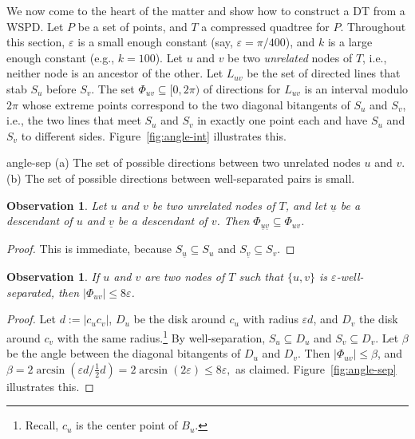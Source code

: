 \documentclass[11pt]{paper}
\newcommand {\eps} {\varepsilon}
\newcommand {\eqdef} {:=}
\newcommand {\child} {\underline}
\newtheorem {observation}[theorem] {Observation}
\begin{document}
We now come to the heart of the matter and show how to construct a DT from
a WSPD. Let $P$ be a set of points, and $T$ a
compressed quadtree for $P$. Throughout this section, $\eps$ is a
small enough constant (say, $\eps = \pi/400$), and $k$ is
a large enough constant (e.g., $k = 100$).
Let $u$ and $v$ be two \emph{unrelated} nodes of $T$, i.e.,
neither node is an ancestor of the other. Let $L_{uv}$ be the 
set of directed lines that stab $S_u$ before $S_v$. 
The set $\Phi_{uv} \subseteq [0, 2 \pi)$ of directions for $L_{uv}$
is an interval modulo ${2\pi}$
whose extreme points correspond to
the two diagonal bitangents of $S_u$ and $S_v$, i.e., the two lines that
meet $S_u$ and $S_v$ in exactly one point each and have $S_u$ and
$S_v$ to different sides. 
Figure~\ref {fig:angle-int} illustrates this.

 {angle-sep} {(a) The set of possible directions 
between two unrelated nodes $u$ and $v$. (b) The set of possible directions 
between well-separated pairs is small.}

\begin {observation} \label {obs:directions-contained}
Let $u$ and $v$ be two unrelated nodes of $T$, and let $\child u$ be a
descendant of $u$ and $\child v$ be a descendant of $v$.
Then $\Phi_{\child u \child v} \subseteq \Phi_{uv}$.
\end {observation}

\begin{proof}
This is immediate, because $S_{\child u} \subseteq S_u$ and
$S_{\child v} \subseteq S_v$.
\end{proof}

\begin{observation}\label{obs:small-Phi}
If $u$ and $v$ are two  nodes of $T$ such that $\{u,v\}$ is
$\eps$-well-separated, then
$|\Phi_{uv}| \leq 8\eps$.
\end{observation}

\begin{proof}
  Let $d \eqdef |c_uc_v|$, $D_u$ be the disk around $c_u$ with radius
  $\eps d$, and $D_v$ the disk around $c_v$ with the same radius.\footnote
  {Recall, $c_u$ is the center point of $B_u$.}
  By well-separation, $S_u \subseteq D_u$ and $S_v \subseteq D_v$. Let $\beta$
  be the angle between the 
  diagonal bitangents of $D_u$ and $D_v$. Then
  $|\Phi_{uv}| \leq \beta$, and 
  $ 
  \beta = 2 \arcsin (\eps d / \frac12 d)
  = 2 \arcsin (2 \eps) \leq 8 \eps,
  $ 
  as claimed. 
  Figure~\ref {fig:angle-sep} illustrates this.
\end{proof}
\end{document}
